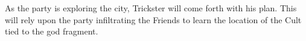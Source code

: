 As the party is exploring the city, Trickster will come forth with his plan.
This will rely upon the party infiltrating the Friends to learn the location of the Cult tied to the god fragment.
